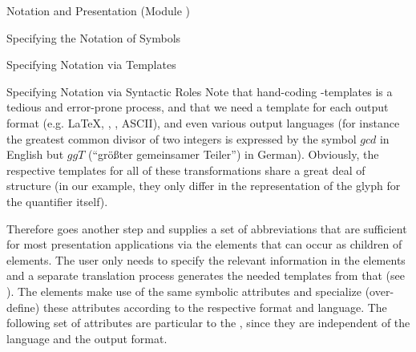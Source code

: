 \begin{tchapter}[id=pres,short=Notation and Presentation]{Notation and Presentation (Module {})}
\begin{tsection}[id=presentation,short=Notation of Symbols]{Specifying the Notation of Symbols}
\begin{tsubsection}[id=pres-templates]{Specifying Notation via Templates}
\end{tsubsection}


\begin{tsubsection}[id=pres-declarative]{Specifying Notation via Syntactic Roles}
  Note that hand-coding {\xslt}-templates is a tedious and error-prone process, and that
  we need a template for each output format (e.g. {\LaTeX}, {\html}, {\pmathml}, ASCII),
  and even various output languages (for instance the greatest common divisor of two
  integers is expressed by the symbol $gcd$ in English but $ggT$ (``gr\"o{\ss}ter
  gemeinsamer Teiler'') in German). Obviously, the respective templates for all of these
  transformations share a great deal of structure (in our example, they only differ in the
  representation of the glyph for the quantifier itself). 

  Therefore {\omdoc} goes another step and supplies a set of abbreviations that are
  sufficient for most presentation applications via the {} elements that can
  occur as children of {} elements. The user only needs to specify
  the relevant information in the {} elements and a separate translation
  process generates the needed {\xslt} templates from that (see
  {}). The {} elements make use of the same symbolic
  attributes and specialize (over-define) these attributes according to the respective
  format and language.  The following set of attributes are particular to the
  {}, since they are independent of the language and the output
  format.


\end{tsubsection}
\end{tsection}
\end{tchapter}

